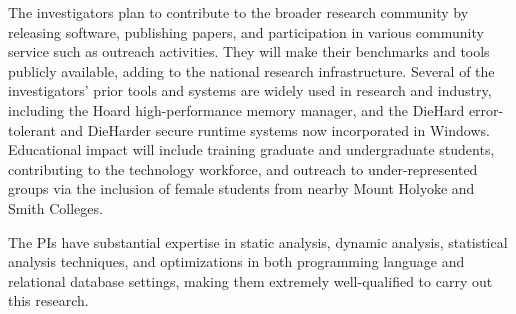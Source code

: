
The investigators plan to contribute to the broader research community
by releasing software, publishing papers, and participation in various
community service such as outreach activities.  They will make their
benchmarks and tools publicly available, adding to the national
research infrastructure. Several of the investigators' prior tools and
systems are widely used in research and industry, including the Hoard
high-performance memory manager, and the DieHard error-tolerant and
DieHarder secure runtime systems now incorporated in
Windows. Educational impact will include training graduate and
undergraduate students, contributing to the technology workforce, and
outreach to under-represented groups via the inclusion of female
students from nearby Mount Holyoke and Smith Colleges.


The PIs have substantial expertise in static analysis, dynamic
analysis, statistical analysis techniques, and optimizations in both
programming language and relational database settings, making them
extremely well-qualified to carry out this research.
